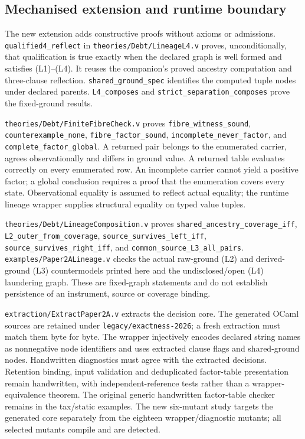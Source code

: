 \documentclass[11pt]{article}
\theoremstyle{definition}
\newcommand{\code}[1]{\texttt{#1}}
\begin{document}
\subsection{Mechanised extension and runtime boundary}\label{ex:app:mechanisation}
The new extension adds constructive proofs without axioms or admissions. \code{qualified4\_\allowbreak{}reflect} in \nolinkurl{theories/Debt/LineageL4.v} proves, unconditionally, that qualification is true exactly when the declared graph is well formed and satisfies (L1)--(L4). It reuses the companion's proved ancestry computation and three-clause reflection. \code{shared\_\allowbreak{}ground\_\allowbreak{}spec} identifies the computed tuple nodes under declared parents. \code{L4\_\allowbreak{}composes} and \code{strict\_\allowbreak{}separation\_\allowbreak{}composes} prove the fixed-ground results.

\nolinkurl{theories/Debt/FiniteFibreCheck.v} proves \code{fibre\_\allowbreak{}witness\_\allowbreak{}sound}, \code{counterexample\_\allowbreak{}none}, \code{fibre\_\allowbreak{}factor\_\allowbreak{}sound}, \code{incomplete\_\allowbreak{}never\_\allowbreak{}factor}, and \code{complete\_\allowbreak{}factor\_\allowbreak{}global}. A returned pair belongs to the enumerated carrier, agrees observationally and differs in ground value. A returned table evaluates correctly on every enumerated row. An incomplete carrier cannot yield a positive factor; a global conclusion requires a proof that the enumeration covers every state. Observational equality is assumed to reflect actual equality; the runtime lineage wrapper supplies structural equality on typed value tuples.

\nolinkurl{theories/Debt/LineageComposition.v} proves \code{shared\_\allowbreak{}ancestry\_\allowbreak{}coverage\_\allowbreak{}iff}, \code{L2\_\allowbreak{}outer\_\allowbreak{}from\_\allowbreak{}coverage}, \code{source\_\allowbreak{}survives\_\allowbreak{}left\_\allowbreak{}iff}, \code{source\_\allowbreak{}survives\_\allowbreak{}right\_\allowbreak{}iff}, and \code{common\_\allowbreak{}source\_\allowbreak{}L3\_\allowbreak{}all\_\allowbreak{}pairs}. \nolinkurl{examples/Paper2ALineage.v} checks the actual raw-ground (L2) and derived-ground (L3) countermodels printed here and the undisclosed/open (L4) laundering graph. These are fixed-graph statements and do not establish persistence of an instrument, source or coverage binding.

\nolinkurl{extraction/ExtractPaper2A.v} extracts the decision core. The generated OCaml sources are retained under \nolinkurl{legacy/exactness-2026}; a fresh extraction must match them byte for byte. The wrapper injectively encodes declared string names as nonnegative node identifiers and uses extracted clause flags and shared-ground nodes. Handwritten diagnostics must agree with the extracted decisions. Retention binding, input validation and deduplicated factor-table presentation remain handwritten, with independent-reference tests rather than a wrapper-equivalence theorem. The original generic handwritten factor-table checker remains in the tax/static examples. The new six-mutant study targets the generated core separately from the eighteen wrapper/diagnostic mutants; all selected mutants compile and are detected.
\end{document}
